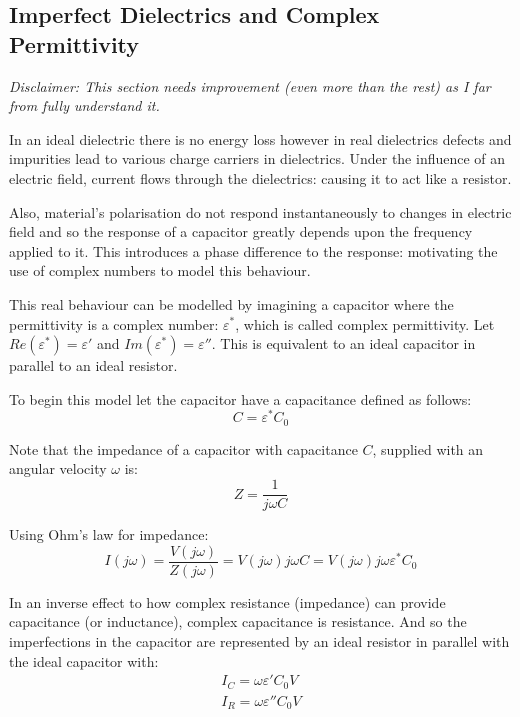 \documentclass[11pt,a4paper]{report}
\begin{document}
\subsection{Imperfect Dielectrics and Complex Permittivity}
\textit{Disclaimer: This section needs improvement (even more than the rest) as I far from fully understand it.}

In an ideal dielectric there is no energy loss however in real dielectrics defects and impurities lead to various charge carriers in dielectrics. Under the influence of an electric field, current flows through the dielectrics: causing it to act like a resistor. 

Also, material's polarisation do not respond instantaneously to changes in electric field and so the response of a capacitor greatly depends upon the frequency applied to it. This introduces a phase difference to the response: motivating the use of complex numbers to model this behaviour.

This real behaviour can be modelled by imagining a capacitor where the permittivity is a complex number: $\varepsilon^*$, which is called complex permittivity. Let $Re(\varepsilon^*)=\varepsilon'$ and $Im(\varepsilon^*)=\varepsilon''$. This is equivalent to an ideal capacitor in parallel to an ideal resistor.

To begin this model let the capacitor have a capacitance defined as follows:
\begin{equation}
	\label{compPerm}
	C=\varepsilon^*C_0
\end{equation}

Note that the impedance of a capacitor with capacitance $C$, supplied with an angular velocity $\omega$ is:
\begin{equation*}
	Z=\frac{1}{j\omega C}
\end{equation*}

Using Ohm's law for impedance:
\begin{equation*}
	I(j\omega) = \frac{V(j\omega)}{Z(j\omega)} = V(j\omega)j\omega C = V(j\omega)j\omega\varepsilon^*C_0
\end{equation*}

In an inverse effect to how complex resistance (impedance) can provide capacitance (or inductance), complex capacitance is resistance. And so the imperfections in the capacitor are represented by an ideal resistor in parallel with the ideal capacitor with:
\begin{eqnarray*}
	I_C = \omega \varepsilon'C_0V \\
	I_R = \omega \varepsilon''C_0V
\end{eqnarray*} 
\end{document}
